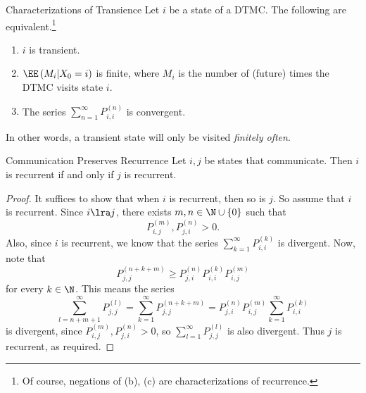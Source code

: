 \documentclass[stat333]{subfiles}
\begin{document}
    \clearpage
    \begin{prop}{Characterizations of Transience}
        Let $i$ be a state of a DTMC. The following are equivalent.\footnote{Of course, negations of (b), (c) are characterizations of recurrence.}
        \begin{enumerate}
            \item $i$ is transient.
            \item $\EE\left( M_i|X_0=i \right)$ is finite, where $M_i$ is the number of (future) times the DTMC visits state $i$.
            \item The series $\sum^{\infty}_{n=1}P^{\left( n \right)}_{i,i}$ is convergent.
        \end{enumerate}
    \end{prop}

    \noindent In other words, a transient state will only be visited \textit{finitely often}.

    \begin{prop}{Communication Preserves Recurrence}
        Let $i,j$ be states that communicate. Then $i$ is recurrent if and only if $j$ is recurrent.
    \end{prop}

    \begin{proof}
        It suffices to show that when $i$ is recurrent, then so is $j$. So assume that $i$ is recurrent. Since $i\lra j$, there exists $m,n\in\N\cup\left\lbrace 0 \right\rbrace$ such that 
        \begin{equation*}
            P_{i,j}^{\left( m \right)} , P^{\left( n \right)}_{j,i}>0.
        \end{equation*}
        Also, since $i$ is recurrent, we know that the series $\sum^{\infty}_{k=1}P^{\left( k \right)}_{i,i}$ is divergent. Now, note that
        \begin{equation*}
            P^{\left( n+k+m \right)}_{j,j} \geq P^{\left( n \right)}_{j,i}P^{\left( k \right)}_{i,i}P^{\left( m \right)}_{i,j} 
        \end{equation*}
        for every $k\in\N$. This means the series
        \begin{equation*}
            \sum^{\infty}_{l=n+m+1} P_{j,j}^{\left( l \right)} = \sum^{\infty}_{k=1} P_{j,j}^{\left( n+k+m \right)} = P^{\left( n \right)}_{j,i}P^{\left( m \right)}_{i,j}\sum^{\infty}_{k=1}P^{\left( k \right)}_{i,i}
        \end{equation*}
        is divergent, since $P^{\left( m \right)}_{i,j},P^{\left( n \right)}_{j,i}>0$, so $\sum^{\infty}_{l=1}P^{\left( l \right)}_{j,j}$ is also divergent. Thus $j$ is recurrent, as required.
    \end{proof}
\end{document}
